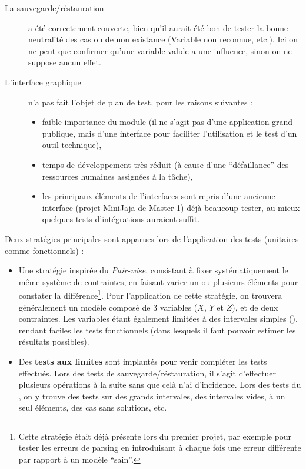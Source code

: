 \label{test:notcovered}

\begin{description}
	\item[La sauvegarde/réstauration] a été correctement couverte, bien qu'il aurait été bon de tester la bonne neutralité des cas  ou de non existance (Variable non reconnue, etc.). Ici on ne peut que confirmer qu'une variable valide a une influence, sinon on ne suppose aucun effet.
	\item[L'interface graphique] n'a pas fait l'objet de plan de test, pour les raisons suivantes :
	\begin{itemize}
		\item faible importance du module (il ne s'agit pas d'une application grand publique, mais d'une interface pour faciliter l'utilisation et le test d'un outil technique),
		\item temps de développement très réduit (à cause d'une ``défaillance'' des ressources humaines assignées à la tâche),
		\item les principaux éléments de l'interfaces sont repris d'une ancienne interface (projet MiniJaja de Master 1) déjà beaucoup tester, au mieux quelques tests d'intégrations auraient suffit.
	\end{itemize}
\end{description}



Deux stratégies principales sont apparues lors de l'application des tests (unitaires comme fonctionnels) :
\begin{itemize}
	\item Une stratégie inspirée du \emph{Pair-wise}, consistant à fixer systématiquement le même système de contraintes, en faisant varier un ou plusieurs éléments pour constater la différence\footnote{Cette stratégie était déjà présente lors du premier projet, par exemple pour tester les erreurs de parsing en introduisant à chaque fois une erreur différente par rapport à un modèle ``sain''.}.
	Pour l'application de cette stratégie, on trouvera généralement un modèle composé de 3 variables ($X$, $Y$ et $Z$), et de deux contraintes.
	Les variables étant également limitées à des intervales simples (\tech{[0..2]}), rendant faciles les tests fonctionnels (dans lesquels il faut pouvoir estimer les résultats possibles).
	
	\item Des \textbf{tests aux limites} sont implantés pour venir compléter les tests effectués.
	Lors des tests de sauvegarde/réstauration, il s'agit d'effectuer plusieurs opérations à la suite sans que celà n'ai d'incidence.
	Lors des tests du \fla, on y trouve des tests sur des grands intervales, des intervales vides, à un seul éléments, des cas sans solutions, etc.
\end{itemize}


